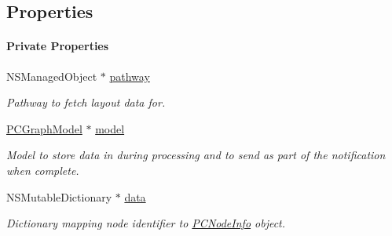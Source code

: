 \subsection*{Properties}
\begin{Indent}\paragraph*{Private Properties}
\begin{DoxyCompactItemize}
\item 
\hypertarget{interface_p_c_layout_fetcher_a469cf4d7167466efe726aee0d305f7aa}{
NSManagedObject $\ast$ \hyperlink{interface_p_c_layout_fetcher_a469cf4d7167466efe726aee0d305f7aa}{pathway}}
\label{interface_p_c_layout_fetcher_a469cf4d7167466efe726aee0d305f7aa}

\begin{DoxyCompactList}\small\item\em Pathway to fetch layout data for. \end{DoxyCompactList}\item 
\hypertarget{interface_p_c_layout_fetcher_ad4444ebf87163dcf3b6a0c58fd23e309}{
\hyperlink{interface_p_c_graph_model}{PCGraphModel} $\ast$ \hyperlink{interface_p_c_layout_fetcher_ad4444ebf87163dcf3b6a0c58fd23e309}{model}}
\label{interface_p_c_layout_fetcher_ad4444ebf87163dcf3b6a0c58fd23e309}

\begin{DoxyCompactList}\small\item\em Model to store data in during processing and to send as part of the notification when complete. \end{DoxyCompactList}\item 
\hypertarget{interface_p_c_layout_fetcher_a4b905f642079d449aca0e0af52533fa0}{
NSMutableDictionary $\ast$ \hyperlink{interface_p_c_layout_fetcher_a4b905f642079d449aca0e0af52533fa0}{data}}
\label{interface_p_c_layout_fetcher_a4b905f642079d449aca0e0af52533fa0}

\begin{DoxyCompactList}\small\item\em Dictionary mapping node identifier to \hyperlink{interface_p_c_node_info}{PCNodeInfo} object. \end{DoxyCompactList}\end{DoxyCompactItemize}
\end{Indent}
